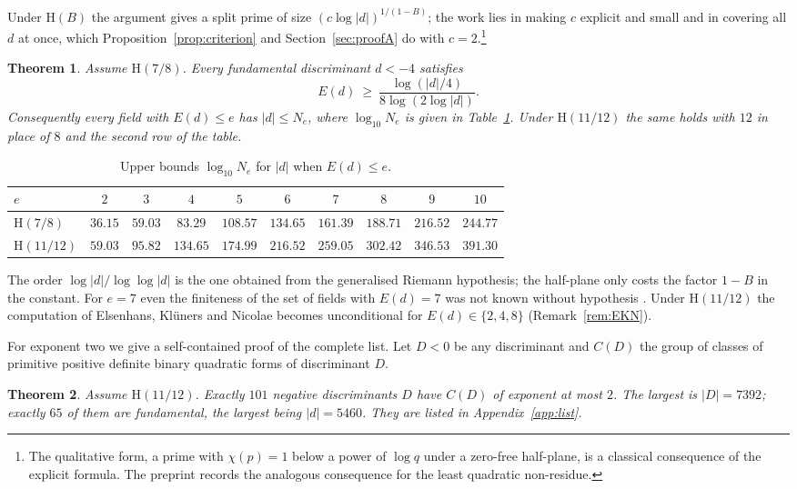 \documentclass[11pt]{amsart}
\newtheorem{introthm}{Theorem}
\theoremstyle{definition}
\theoremstyle{remark}
\numberwithin{equation}{section}
\newcommand{\Hyp}{\mathrm{H}}
\begin{document}
Under $\Hyp(B)$ the argument gives a split prime of size $(c\log|d|)^{1/(1-B)}$; the work lies in making $c$ explicit and small and in covering all $d$ at once, which Proposition~\ref{prop:criterion} and Section~\ref{sec:proofA} do with $c=2$.\footnote{The qualitative form, a prime with $\chi(p)=1$ below a power of $\log q$ under a zero-free half-plane, is a classical consequence of the explicit formula. The preprint \cite{OAI-b} records the analogous consequence for the least quadratic non-residue.}

\begin{introthm}\label{thm:B}
Assume $\Hyp(7/8)$. Every fundamental discriminant $d<-4$ satisfies
\[
E(d)\ \ge\ \frac{\log(|d|/4)}{8\log(2\log|d|)} .
\]
Consequently every field with $E(d)\le e$ has $|d|\le N_e$, where $\log_{10}N_e$ is given in Table~\ref{tab:Ne}. Under $\Hyp(11/12)$ the same holds with $12$ in place of $8$ and the second row of the table.
\end{introthm}

\begin{table}[ht]
\centering
\caption{Upper bounds $\log_{10}N_e$ for $|d|$ when $E(d)\le e$.}\label{tab:Ne}
\begin{tabular}{@{}lccccccccc@{}}
\toprule
$e$ & $2$ & $3$ & $4$ & $5$ & $6$ & $7$ & $8$ & $9$ & $10$\\
\midrule
$\Hyp(7/8)$ & $36.15$ & $59.03$ & $83.29$ & $108.57$ & $134.65$ & $161.39$ & $188.71$ & $216.52$ & $244.77$\\
$\Hyp(11/12)$ & $59.03$ & $95.82$ & $134.65$ & $174.99$ & $216.52$ & $259.05$ & $302.42$ & $346.53$ & $391.30$\\
\bottomrule
\end{tabular}
\end{table}

The order $\log|d|/\log\log|d|$ is the one obtained from the generalised Riemann hypothesis; the half-plane only costs the factor $1-B$ in the constant. For $e=7$ even the finiteness of the set of fields with $E(d)=7$ was not known without hypothesis \cite{EKN20}. Under $\Hyp(11/12)$ the computation of Elsenhans, Kl\"uners and Nicolae becomes unconditional for $E(d)\in\{2,4,8\}$ (Remark~\ref{rem:EKN}).

For exponent two we give a self-contained proof of the complete list. Let $D<0$ be any discriminant and $C(D)$ the group of classes of primitive positive definite binary quadratic forms of discriminant $D$.

\begin{introthm}\label{thm:C}
Assume $\Hyp(11/12)$. Exactly $101$ negative discriminants $D$ have $C(D)$ of exponent at most $2$. The largest is $|D|=7392$; exactly $65$ of them are fundamental, the largest being $|d|=5460$. They are listed in Appendix~\ref{app:list}.
\end{introthm}
\end{document}
